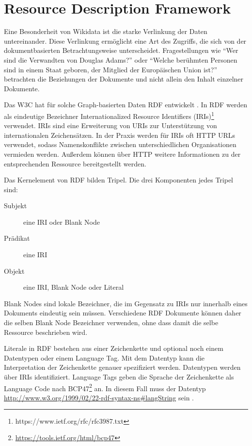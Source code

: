 \section{Resource Description Framework}
Eine Besonderheit von Wikidata ist die starke Verlinkung der Daten untereinander.
Diese Verlinkung ermöglicht eine Art des Zugriffs, die sich von der dokumentbasierten Betrachtungsweise unterscheidet.
Fragestellungen wie "`Wer sind die Verwandten von Douglas Adams?"' oder "`Welche berühmten Personen sind in einem Staat geboren, der Mitglied der Europäischen Union ist?"' betrachten die Beziehungen der Dokumente und nicht allein den Inhalt einzelner Dokumente.

Das W3C hat für solche Graph-basierten Daten RDF entwickelt \cite{rdf-spec}.
In RDF werden als eindeutige Bezeichner Internationalized Resource Identifiers (IRIs)\footnote{https://www.ietf.org/rfc/rfc3987.txt} verwendet.
IRIs sind eine Erweiterung von URIs zur Unterstützung von internationalen Zeichensätzen.
In der Praxis werden für IRIs oft HTTP URLs verwendet, sodass Namenskonflikte zwischen unterschiedlichen Organisationen vermieden werden.
Außerdem können über HTTP weitere Informationen zu der entsprechenden Ressource bereitgestellt werden.

Das Kernelement von RDF bilden Tripel. Die drei Komponenten jedes Tripel sind:
\begin{description}
\item[Subjekt] eine IRI oder Blank Node
\item[Prädikat] eine IRI
\item[Objekt] eine IRI, Blank Node oder Literal
\end{description}
Blank Nodes sind lokale Bezeichner, die im Gegensatz zu IRIs nur innerhalb eines Dokuments eindeutig sein müssen.
Verschiedene RDF Dokumente können daher die selben Blank Node Bezeichner verwenden, ohne dass damit die selbe Ressource beschrieben wird.

Literale in RDF bestehen aus einer Zeichenkette und optional noch einem Datentypen oder einem Language Tag.
Mit dem Datentyp kann die Interpretation der Zeichenkette genauer spezifiziert werden.
Datentypen werden über IRIs identifiziert.
Language Tags geben die Sprache der Zeichenkette als Language Code nach BCP47\footnote{\url{https://tools.ietf.org/html/bcp47}} an.
In diesem Fall muss der Datentyp \url{http://www.w3.org/1999/02/22-rdf-syntax-ns#langString} sein \cite{rdf-spec} .


